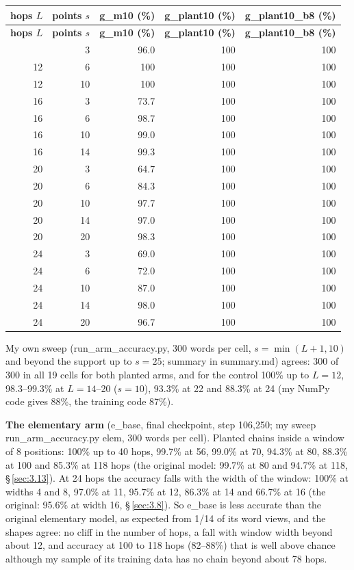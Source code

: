 \documentclass[paper=a4,fontsize=11pt,DIV=11,parskip=half,headings=small,numbers=noendperiod]{scrartcl}
\DeclareRobustCommand{\lead}[1]{\textsf{\bfseries\color{accent}#1}}
\DeclareRobustCommand{\code}[1]{{\fontseries{m}\ttfamily #1}}
\DeclareRobustCommand{\hdr}[1]{\textsf{\bfseries #1}}
\begin{document}
{\small\nopagebreak[4]
\begin{longtable}{@{}r r r r r@{}}
\toprule
\hdr{hops $L$} & \hdr{points $s$} & \hdr{\code{g\_\allowbreak{}m10} (\%)} & \hdr{\code{g\_\allowbreak{}plant10} (\%)} & \hdr{\code{g\_\allowbreak{}plant10\_\allowbreak{}b8} (\%)} \\
\midrule
\endfirsthead
\toprule
\hdr{hops $L$} & \hdr{points $s$} & \hdr{\code{g\_\allowbreak{}m10} (\%)} & \hdr{\code{g\_\allowbreak{}plant10} (\%)} & \hdr{\code{g\_\allowbreak{}plant10\_\allowbreak{}b8} (\%)} \\
\midrule
\endhead
\bottomrule
\endlastfoot
12 & 3 & 96.0 & 100 & 100 \\
12 & 6 & 100 & 100 & 100 \\
12 & 10 & 100 & 100 & 100 \\
16 & 3 & 73.7 & 100 & 100 \\
16 & 6 & 98.7 & 100 & 100 \\
16 & 10 & 99.0 & 100 & 100 \\
16 & 14 & 99.3 & 100 & 100 \\
20 & 3 & 64.7 & 100 & 100 \\
20 & 6 & 84.3 & 100 & 100 \\
20 & 10 & 97.7 & 100 & 100 \\
20 & 14 & 97.0 & 100 & 100 \\
20 & 20 & 98.3 & 100 & 100 \\
24 & 3 & 69.0 & 100 & 100 \\
24 & 6 & 72.0 & 100 & 100 \\
24 & 10 & 87.0 & 100 & 100 \\
24 & 14 & 98.0 & 100 & 100 \\
24 & 20 & 96.7 & 100 & 100 \\
\end{longtable}}

My own sweep (\code{run\_\allowbreak{}arm\_\allowbreak{}accuracy.\allowbreak{}py}, 300 words per cell,
$s=\min(L+1,10)$ and beyond the support up to $s=25$; summary in \code{summary.\allowbreak{}md}) agrees: 300 of
300 in all 19 cells for both planted arms, and for the control 100\% up to $L=12$, 98.3–99.3\% at $L=14$–20
($s=10$), 93.3\% at 22 and 88.3\% at 24 (my NumPy code gives 88\%, the training code 87\%).

\lead{The elementary arm} (\code{e\_\allowbreak{}base}, final checkpoint, step 106,250; my sweep
\code{run\_\allowbreak{}arm\_\allowbreak{}accuracy.\allowbreak{}py elem}, 300 words per cell). Planted chains
inside a window of 8 positions: 100\% up to 40 hops, 99.7\% at 56, 99.0\% at 70, 94.3\% at 80, 88.3\% at 100 and
85.3\% at 118 hops (the original model: 99.7\% at 80 and 94.7\% at 118, \S\,\ref{sec:3.13}). At 24 hops the
accuracy falls with the width of the window: 100\% at widths 4 and 8, 97.0\% at 11, 95.7\% at 12, 86.3\% at 14
and 66.7\% at 16 (the original: 95.6\% at width 16, \S\,\ref{sec:3.8}). So \code{e\_\allowbreak{}base} is less
accurate than the original elementary model, as expected from 1/14 of its word views, and the shapes agree: no
cliff in the number of hops, a fall with window width beyond about 12, and accuracy at 100 to 118 hops (82–88\%)
that is well above chance although my sample of its training data has no chain beyond about 78 hops.
\end{document}
